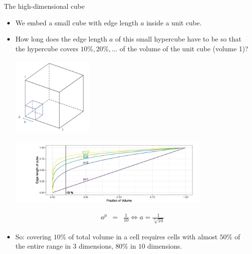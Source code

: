 \begin{vbframe}{The high-dimensional cube}

\begin{itemize}
  \item We embed a small cube with edge length $a$ inside a unit cube.
  \item How long does the edge length $a$ of this small hypercube have to be so that the hypercube covers $10\%, 20\%, ...$ of the volume of the unit cube (volume 1)?

  \medskip
  \begin{center}
    \includegraphics[height = 4cm, width = 4cm]{figure_man/hypercube.png}
  \end{center}

\framebreak

\vspace*{0.1cm}
\begin{center}
\includegraphics[width = 10cm ]{figure_man/high-dim-cube.png}
\end{center}

\medskip 

  \begin{footnotesize}
  \begin{eqnarray*}
    a^p &=& \frac{1}{10} \Leftrightarrow a = \frac{1}{\sqrt[p]{10}}
  \end{eqnarray*}
  \end{footnotesize}
  \vspace*{-0.5cm}
  \item  So: covering $10\%$ of total volume in a cell requires cells with almost $50\%$ of the entire range in $3$ dimensions, $80\%$ in $10$ dimensions. 
\end{itemize}

\end{vbframe}


